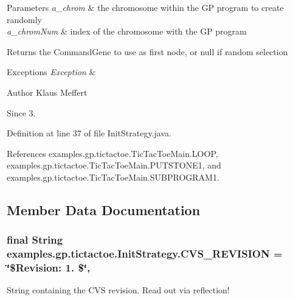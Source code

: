 \begin{DoxyParams}{Parameters}
{\em a\-\_\-chrom} & the chromosome within the G\-P program to create randomly \\
\hline
{\em a\-\_\-chrom\-Num} & index of the chromosome with the G\-P program \\
\hline
\end{DoxyParams}
\begin{DoxyReturn}{Returns}
the Command\-Gene to use as first node, or null if random selection 
\end{DoxyReturn}

\begin{DoxyExceptions}{Exceptions}
{\em Exception} & \\
\hline
\end{DoxyExceptions}
\begin{DoxyAuthor}{Author}
Klaus Meffert 
\end{DoxyAuthor}
\begin{DoxySince}{Since}
3. 
\end{DoxySince}


Definition at line 37 of file Init\-Strategy.\-java.



References examples.\-gp.\-tictactoe.\-Tic\-Tac\-Toe\-Main.\-L\-O\-O\-P, examples.\-gp.\-tictactoe.\-Tic\-Tac\-Toe\-Main.\-P\-U\-T\-S\-T\-O\-N\-E1, and examples.\-gp.\-tictactoe.\-Tic\-Tac\-Toe\-Main.\-S\-U\-B\-P\-R\-O\-G\-R\-A\-M1.



\subsection{Member Data Documentation}
\hypertarget{classexamples_1_1gp_1_1tictactoe_1_1_init_strategy_a7d1669160f076ccda54ad3193704f903}{
\subsubsection[{C\-V\-S\-\_\-\-R\-E\-V\-I\-S\-I\-O\-N}]{\setlength{\rightskip}{0pt plus 5cm}final String examples.\-gp.\-tictactoe.\-Init\-Strategy.\-C\-V\-S\-\_\-\-R\-E\-V\-I\-S\-I\-O\-N = \char`\"{}\$Revision\-: 1. \$\char`\"{}\hspace{0.3cm}{\ttfamily [static]}, {\ttfamily [private]}}}\label{classexamples_1_1gp_1_1tictactoe_1_1_init_strategy_a7d1669160f076ccda54ad3193704f903}
String containing the C\-V\-S revision. Read out via reflection! 

